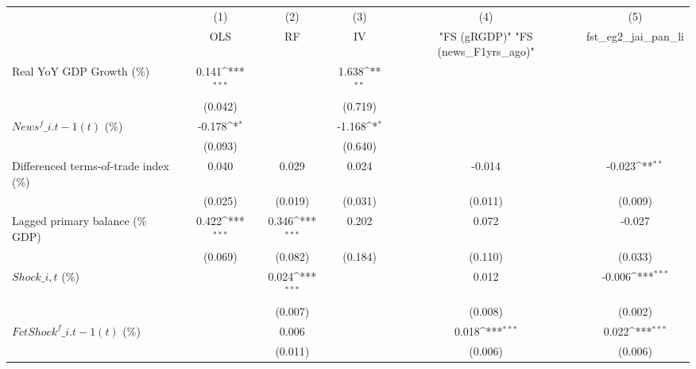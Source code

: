 {
\def\sym#1{\ifmmode^{#1}\else\(^{#1}\)\fi}
\begin{tabular}{l*{5}{c}}
\toprule
                    &\multicolumn{1}{c}{(1)}&\multicolumn{1}{c}{(2)}&\multicolumn{1}{c}{(3)}&\multicolumn{1}{c}{(4)}&\multicolumn{1}{c}{(5)}\\
                    &\multicolumn{1}{c}{OLS}&\multicolumn{1}{c}{RF}&\multicolumn{1}{c}{IV}&\multicolumn{1}{c}{ "FS (gRGDP)"  "FS (news\_F1yrs\_ago)" }&\multicolumn{1}{c}{fst\_eg2\_jai\_pan\_li}\\
\midrule
Real YoY GDP Growth (\%)&       0.141\sym{***}&                     &       1.638\sym{**} &                     &                     \\
                    &     (0.042)         &                     &     (0.719)         &                     &                     \\
\addlinespace
$ News^f\_{i.t-1}(t)$ (\%)&      -0.178\sym{*}  &                     &      -1.168\sym{*}  &                     &                     \\
                    &     (0.093)         &                     &     (0.640)         &                     &                     \\
\addlinespace
Differenced terms-of-trade index (\%)&       0.040         &       0.029         &       0.024         &      -0.014         &      -0.023\sym{**} \\
                    &     (0.025)         &     (0.019)         &     (0.031)         &     (0.011)         &     (0.009)         \\
\addlinespace
Lagged primary balance (\% GDP)&       0.422\sym{***}&       0.346\sym{***}&       0.202         &       0.072         &      -0.027         \\
                    &     (0.069)         &     (0.082)         &     (0.184)         &     (0.110)         &     (0.033)         \\
\addlinespace
$ Shock\_{i,t}$ (\%) &                     &       0.024\sym{***}&                     &       0.012         &      -0.006\sym{***}\\
                    &                     &     (0.007)         &                     &     (0.008)         &     (0.002)         \\
\addlinespace
$ FctShock^f\_{i.t-1}(t)$ (\%)&                     &       0.006         &                     &       0.018\sym{***}&       0.022\sym{***}\\
                    &                     &     (0.011)         &                     &     (0.006)         &     (0.006)         \\

\end{tabular}}

